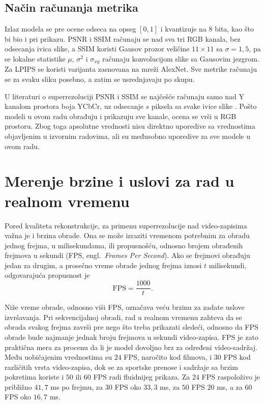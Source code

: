\documentclass[12pt,a4paper]{article}
\begin{document}
\subsection{Način računanja metrika}

Izlaz modela se pre ocene odseca na opseg $[0,1]$ i kvantizuje na 8 bita, kao što bi bio i pri prikazu. PSNR i SSIM računaju se nad sva tri RGB kanala, bez odsecanja ivica slike, a SSIM koristi Gausov prozor veličine $11\times11$ sa $\sigma=1{,}5$, pa se lokalne statistike $\mu$, $\sigma^2$ i $\sigma_{xy}$ računaju konvolucijom slike sa Gausovim jezgrom. Za LPIPS se koristi varijanta zasnovana na mreži AlexNet. Sve metrike računaju se za svaku sliku posebno, a zatim se usrednjavaju po skupu.

U literaturi o superrezoluciji PSNR i SSIM se najčešće računaju samo nad Y kanalom prostora boja YCbCr, uz odsecanje $s$ piksela sa svake ivice slike \cite{SRSurvey}. Pošto modeli u ovom radu obrađuju i prikazuju sve kanale, ocena se vrši u RGB prostoru. Zbog toga apsolutne vrednosti nisu direktno uporedive sa vrednostima objavljenim u izvornim radovima, ali su međusobno uporedive za sve modele u ovom radu.


\section{Merenje brzine i uslovi za rad u realnom vremenu}
\label{sec:brzina}

Pored kvaliteta rekonstrukcije, za primenu superrezolucije nad video-zapisima važna je i brzina obrade. Ona se može izraziti vremenom potrebnim za obradu jednog frejma, u milisekundama, ili propusnošću, odnosno brojem obrađenih frejmova u sekundi (FPS, engl.\ \textit{Frames Per Second}). Ako se frejmovi obrađuju jedan za drugim, a prosečno vreme obrade jednog frejma iznosi $t$ milisekundi, odgovarajuća propusnost je
\begin{equation}
    \mathrm{FPS}=\frac{1000}{t}.
\end{equation}

Niže vreme obrade, odnosno viši FPS, označava veću brzinu za zadate uslove izvršavanja. Pri sekvencijalnoj obradi, rad u realnom vremenu zahteva da se obrada svakog frejma završi pre nego što treba prikazati sledeći, odnosno da FPS obrade bude najmanje jednak broju frejmova u sekundi video-zapisa. FPS je zato praktična mera za procenu da li je model dovoljno brz za određeni video-sadržaj. Među uobičajenim vrednostima su $24$ FPS, naročito kod filmova, i $30$ FPS kod različitih vrsta video-zapisa, dok se za sportske prenose i sadržaje sa brzim pokretima koriste i $50$ ili $60$ FPS radi fluidnijeg prikaza. Za $24$ FPS raspoloživo je približno $41{,}7$ ms po frejmu, za $30$ FPS oko $33{,}3$ ms, za $50$ FPS $20$ ms, a za $60$ FPS oko $16{,}7$ ms.
\end{document}
